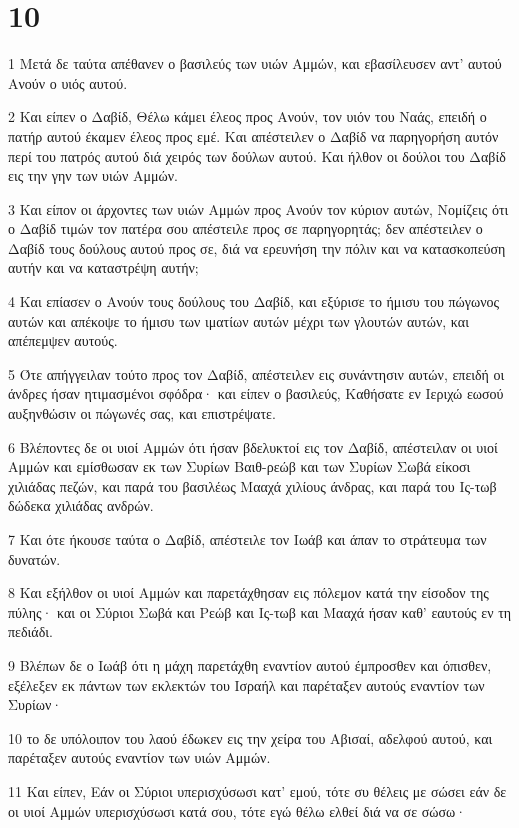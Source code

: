 \chapter{10}

\par 1 Μετά δε ταύτα απέθανεν ο βασιλεύς των υιών Αμμών, και εβασίλευσεν αντ' αυτού Ανούν ο υιός αυτού.
\par 2 Και είπεν ο Δαβίδ, Θέλω κάμει έλεος προς Ανούν, τον υιόν του Ναάς, επειδή ο πατήρ αυτού έκαμεν έλεος προς εμέ. Και απέστειλεν ο Δαβίδ να παρηγορήση αυτόν περί του πατρός αυτού διά χειρός των δούλων αυτού. Και ήλθον οι δούλοι του Δαβίδ εις την γην των υιών Αμμών.
\par 3 Και είπον οι άρχοντες των υιών Αμμών προς Ανούν τον κύριον αυτών, Νομίζεις ότι ο Δαβίδ τιμών τον πατέρα σου απέστειλε προς σε παρηγορητάς; δεν απέστειλεν ο Δαβίδ τους δούλους αυτού προς σε, διά να ερευνήση την πόλιν και να κατασκοπεύση αυτήν και να καταστρέψη αυτήν;
\par 4 Και επίασεν ο Ανούν τους δούλους του Δαβίδ, και εξύρισε το ήμισυ του πώγωνος αυτών και απέκοψε το ήμισυ των ιματίων αυτών μέχρι των γλουτών αυτών, και απέπεμψεν αυτούς.
\par 5 Ότε απήγγειλαν τούτο προς τον Δαβίδ, απέστειλεν εις συνάντησιν αυτών, επειδή οι άνδρες ήσαν ητιμασμένοι σφόδρα· και είπεν ο βασιλεύς, Καθήσατε εν Ιεριχώ εωσού αυξηνθώσιν οι πώγωνές σας, και επιστρέψατε.
\par 6 Βλέποντες δε οι υιοί Αμμών ότι ήσαν βδελυκτοί εις τον Δαβίδ, απέστειλαν οι υιοί Αμμών και εμίσθωσαν εκ των Συρίων Βαιθ-ρεώβ και των Συρίων Σωβά είκοσι χιλιάδας πεζών, και παρά του βασιλέως Μααχά χιλίους άνδρας, και παρά του Ις-τωβ δώδεκα χιλιάδας ανδρών.
\par 7 Και ότε ήκουσε ταύτα ο Δαβίδ, απέστειλε τον Ιωάβ και άπαν το στράτευμα των δυνατών.
\par 8 Και εξήλθον οι υιοί Αμμών και παρετάχθησαν εις πόλεμον κατά την είσοδον της πύλης· και οι Σύριοι Σωβά και Ρεώβ και Ις-τωβ και Μααχά ήσαν καθ' εαυτούς εν τη πεδιάδι.
\par 9 Βλέπων δε ο Ιωάβ ότι η μάχη παρετάχθη εναντίον αυτού έμπροσθεν και όπισθεν, εξέλεξεν εκ πάντων των εκλεκτών του Ισραήλ και παρέταξεν αυτούς εναντίον των Συρίων·
\par 10 το δε υπόλοιπον του λαού έδωκεν εις την χείρα του Αβισαί, αδελφού αυτού, και παρέταξεν αυτούς εναντίον των υιών Αμμών.
\par 11 Και είπεν, Εάν οι Σύριοι υπερισχύσωσι κατ' εμού, τότε συ θέλεις με σώσει εάν δε οι υιοί Αμμών υπερισχύσωσι κατά σου, τότε εγώ θέλω ελθεί διά να σε σώσω·
